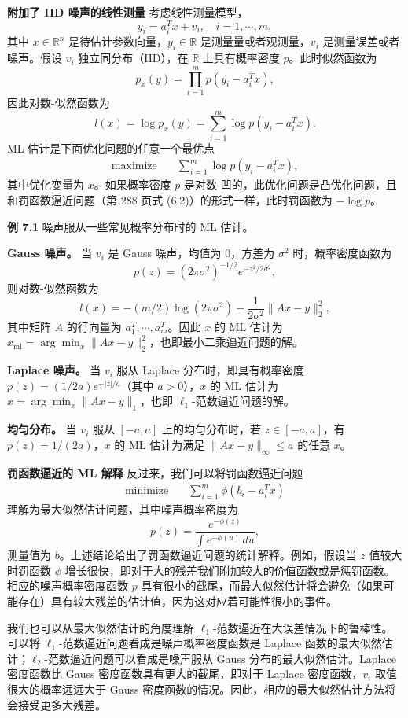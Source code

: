 \documentclass[UTF8,12pt,a4paper,fontset=fandol]{ctexart}
\begin{document}
\noindent\textbf{附加了 IID 噪声的线性测量}\quad
考虑线性测量模型，
\[
y_i=a_i^T x+v_i,\quad i=1,\cdots,m,
\]
其中 $x\in\mathbb{R}^n$ 是待估计参数向量，$y_i\in\mathbb{R}$ 是测量量或者观测量，$v_i$ 是测量误差或者噪声。假设 $v_i$ 独立同分布（IID），在 $\mathbb{R}$ 上具有概率密度 $p$。此时似然函数为
\[
p_x(y)=\prod_{i=1}^m p(y_i-a_i^T x),
\]
因此对数-似然函数为
\[
l(x)=\log p_x(y)=\sum_{i=1}^m \log p(y_i-a_i^T x).
\]
ML 估计是下面优化问题的任意一个最优点
\begin{equation}
\begin{aligned}
\text{maximize}\quad & \sum_{i=1}^m \log p(y_i-a_i^T x),
\end{aligned}
\tag{7.2}
\end{equation}
其中优化变量为 $x$。如果概率密度 $p$ 是对数-凹的，此优化问题是凸优化问题，且和罚函数逼近问题（第 288 页式 (6.2)）的形式一样，此时罚函数为 $-\log p$。

\noindent\textbf{例 7.1}\quad
噪声服从一些常见概率分布时的 ML 估计。

\noindent\textbf{Gauss 噪声。}\quad
当 $v_i$ 是 Gauss 噪声，均值为 $0$，方差为 $\sigma^2$ 时，概率密度函数为
\[
p(z)=(2\pi\sigma^2)^{-1/2}e^{-z^2/2\sigma^2},
\]
则对数-似然函数为
\[
l(x)=-(m/2)\log(2\pi\sigma^2)-\frac{1}{2\sigma^2}\|Ax-y\|_2^2,
\]
其中矩阵 $A$ 的行向量为 $a_1^T,\cdots,a_m^T$。因此 $x$ 的 ML 估计为 $x_{\mathrm{ml}}=\arg\min_x\|Ax-y\|_2^2$，也即最小二乘逼近问题的解。

\noindent\textbf{Laplace 噪声。}\quad
当 $v_i$ 服从 Laplace 分布时，即具有概率密度 $p(z)=(1/2a)e^{-|z|/a}$（其中 $a>0$），$x$ 的 ML 估计为 $\hat{x}=\arg\min_x\|Ax-y\|_1$，也即 $\ell_1$-范数逼近问题的解。

\noindent\textbf{均匀分布。}\quad
当 $v_i$ 服从 $[-a,a]$ 上的均匀分布时，若 $z\in[-a,a]$，有 $p(z)=1/(2a)$，$x$ 的 ML 估计为满足 $\|Ax-y\|_\infty\leq a$ 的任意 $x$。

\noindent\textbf{罚函数逼近的 ML 解释}\quad
反过来，我们可以将罚函数逼近问题
\[
\begin{aligned}
\text{minimize}\quad & \sum_{i=1}^m \phi(b_i-a_i^T x)
\end{aligned}
\]
理解为最大似然估计问题，其中噪声概率密度为
\[
p(z)=\frac{e^{-\phi(z)}}{\int e^{-\phi(u)}\,du},
\]
测量值为 $b$。上述结论给出了罚函数逼近问题的统计解释。例如，假设当 $z$ 值较大时罚函数 $\phi$ 增长很快，即对于大的残差我们附加较大的价值函数或是惩罚函数。相应的噪声概率密度函数 $p$ 具有很小的截尾，而最大似然估计将会避免（如果可能存在）具有较大残差的估计值，因为这对应着可能性很小的事件。

我们也可以从最大似然估计的角度理解 $\ell_1$-范数逼近在大误差情况下的鲁棒性。可以将 $\ell_1$-范数逼近问题看成是噪声概率密度函数是 Laplace 函数的最大似然估计；$\ell_2$-范数逼近问题可以看成是噪声服从 Gauss 分布的最大似然估计。Laplace 密度函数比 Gauss 密度函数具有更大的截尾，即对于 Laplace 密度函数，$v_i$ 取值很大的概率远远大于 Gauss 密度函数的情况。因此，相应的最大似然估计方法将会接受更多大残差。
\end{document}
